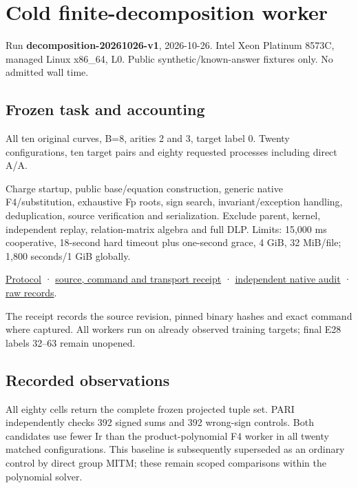 \documentclass[
  10pt,
]{article}
\author{}
\date{}
\begin{document}
\section{Cold finite-decomposition
worker}\label{cold-finite-decomposition-worker}

Run \textbf{decomposition-20261026-v1}, 2026-10-26. Intel Xeon Platinum
8573C, managed Linux x86\_64, L0. Public synthetic/known-answer fixtures
only. No admitted wall time.

\subsection{Frozen task and
accounting}\label{frozen-task-and-accounting}

All ten original curves, B=8, arities 2 and 3, target label 0. Twenty
configurations, ten target pairs and eighty requested processes
including direct A/A.

Charge startup, public base/equation construction, generic native
F4/substitution, exhaustive Fp roots, sign search, invariant/exception
handling, deduplication, source verification and serialization. Exclude
parent, kernel, independent replay, relation-matrix algebra and full
DLP. Limits: 15,000 ms cooperative, 18-second hard timeout plus
one-second grace, 4 GiB, 32 MiB/file; 1,800 seconds/1 GiB globally.

\href{../../../execution-v3/DECOMPOSITION_PROTOCOL_V1.md}{Protocol} ·
\href{../../../execution-v3/runs/decomposition-20261026-v1.transport.json}{source,
command and transport receipt} ·
\href{../../../execution-v3/decomposition-audit-20261026-v1/AUDIT.json}{independent
native audit} ·
\href{../../../execution-v3/runs/decomposition-20261026-v1/RECORDS.json}{raw
records}.

The receipt records the source revision, pinned binary hashes and exact
command where captured. All workers run on already observed training
targets; final E28 labels 32--63 remain unopened.

\subsection{Recorded observations}\label{recorded-observations}

All eighty cells return the complete frozen projected tuple set. PARI
independently checks 392 signed sums and 392 wrong-sign controls. Both
candidates use fewer Ir than the product-polynomial F4 worker in all
twenty matched configurations. This baseline is subsequently superseded
as an ordinary control by direct group MITM; these remain scoped
comparisons within the polynomial solver.
\end{document}
